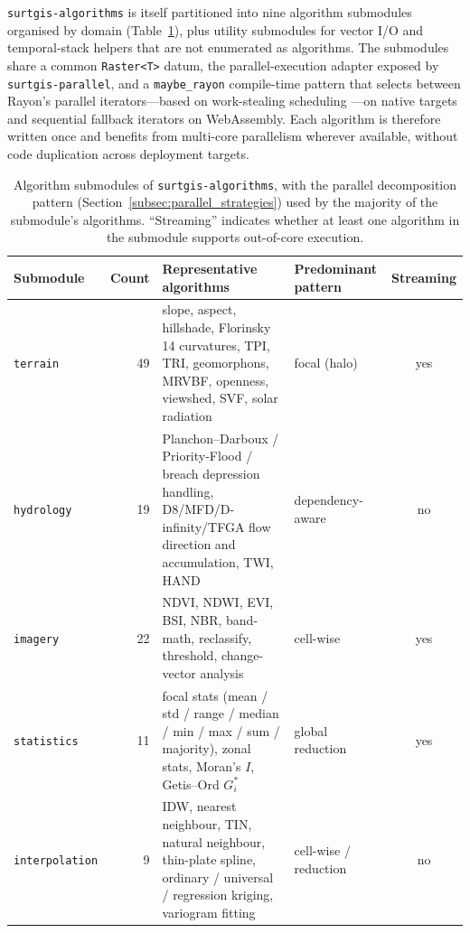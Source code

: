 \documentclass[preprint,review,12pt,authoryear]{elsarticle}
\begin{document}
\texttt{surtgis-algorithms} is itself partitioned into nine algorithm submodules organised by domain (Table~\ref{tab:modules}), plus utility submodules for vector I/O and temporal-stack helpers that are not enumerated as algorithms. The submodules share a common \texttt{Raster<T>} datum, the parallel-execution adapter exposed by \texttt{surtgis-parallel}, and a \texttt{maybe\_rayon} compile-time pattern that selects between Rayon's parallel iterators---based on work-stealing scheduling \citep{blumofe1999}---on native targets and sequential fallback iterators on WebAssembly. Each algorithm is therefore written once and benefits from multi-core parallelism wherever available, without code duplication across deployment targets.

\begin{table}[htbp]
\centering
\caption{Algorithm submodules of \texttt{surtgis-algorithms}, with the parallel decomposition pattern (Section~\ref{subsec:parallel_strategies}) used by the majority of the submodule's algorithms. ``Streaming'' indicates whether at least one algorithm in the submodule supports out-of-core execution.}
\label{tab:modules}
\begin{tabular}{@{}l r p{4.6cm} l c@{}}
\toprule
Submodule        & Count & Representative algorithms                                  & Predominant pattern   & Streaming \\
\midrule
\texttt{terrain}        & 49 & slope, aspect, hillshade, Florinsky 14 curvatures, TPI, TRI, geomorphons, MRVBF, openness, viewshed, SVF, solar radiation         & focal (halo)          & yes \\
\texttt{hydrology}      & 19 & Planchon--Darboux / Priority-Flood / breach depression handling, D8/MFD/D-infinity/TFGA flow direction and accumulation, TWI, HAND & dependency-aware      & no  \\
\texttt{imagery}        & 22 & NDVI, NDWI, EVI, BSI, NBR, band-math, reclassify, threshold, change-vector analysis                                              & cell-wise              & yes \\
\texttt{statistics}     & 11 & focal stats (mean / std / range / median / min / max / sum / majority), zonal stats, Moran's $I$, Getis--Ord $G_i^*$                & global reduction       & yes \\
\texttt{interpolation}  & 9  & IDW, nearest neighbour, TIN, natural neighbour, thin-plate spline, ordinary / universal / regression kriging, variogram fitting    & cell-wise / reduction  & no  \\

\end{tabular}
\end{table}
\end{document}
